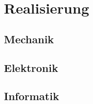 \begin{frame}
    \titlepage
\end{frame}

\setcounter{tocdepth}{1} %
\begin{frame}
    \tableofcontents
\end{frame}


\section{Realisierung}
\subsection{Mechanik}


\subsection{Elektronik}
\subsection{Informatik}




